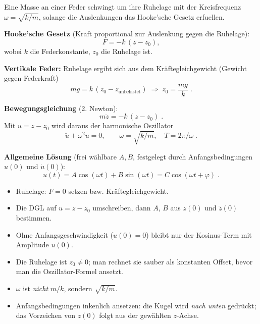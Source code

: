 

Eine Masse an einer Feder schwingt um ihre Ruhelage mit der
Kreisfrequenz $\omega=\sqrt{k/m}$, solange die Auslenkungen das
Hooke'sche Gesetz erfuellen.

\begin{werkzeugkasten}[Werkzeuge]
\textbf{Hooke'sche Gesetz} (Kraft proportional zur Auslenkung gegen die
Ruhelage):
\begin{equation}
  F=-k\,(z-z_0),
\end{equation}
wobei $k$ die Federkonstante, $z_0$ die Ruhelage ist.

\textbf{Vertikale Feder:} Ruhelage ergibt sich aus dem Kräftegleichgewicht
(Gewicht gegen Federkraft)
\begin{equation}
  m g=k\,(z_0-z_{\text{unbelastet}})\;\Rightarrow\;
  z_0=\frac{m g}{k}\;.
\end{equation}

\textbf{Bewegungsgleichung} (2. Newton):
\begin{equation}
  m\ddot z=-k\,(z-z_0)\;.
\end{equation}
Mit $u=z-z_0$ wird daraus der harmonische Oszillator
\begin{equation}
  \ddot u+\omega^2 u=0,\qquad \omega=\sqrt{k/m},\quad
  T=2\pi/\omega\;.
\end{equation}

\textbf{Allgemeine Lösung} (frei wählbare $A,B$, festgelegt durch
Anfangsbedingungen $u(0)$ und $\dot u(0)$):
\begin{equation}
  u(t)=A\cos(\omega t)+B\sin(\omega t)=C\cos(\omega t+\varphi)\;.
\end{equation}
\end{werkzeugkasten}

\begin{werkzeugkasten}[Vorgehen]
\begin{itemize}
  \item Ruhelage: $F=0$ setzen bzw. Kräftegleichgewicht.
  \item Die DGL auf $u=z-z_0$ umschreiben, dann $A$, $B$ aus $z(0)$ und
        $\dot z(0)$ bestimmen.
  \item Ohne Anfangsgeschwindigkeit ($\dot u(0)=0$) bleibt nur der
        Kosinus-Term mit Amplitude $u(0)$.
\end{itemize}
\end{werkzeugkasten}

\begin{achtung}
\begin{itemize}
  \item Die Ruhelage ist $z_0\ne0$; man rechnet sie sauber als konstanten
        Offset, bevor man die Oszillator-Formel ansetzt.
  \item $\omega$ ist \emph{nicht} $m/k$, sondern $\sqrt{k/m}$.
  \item Anfangsbedingungen inkenlich ansetzen: die Kugel wird \emph{nach
        unten} gedrückt; das Vorzeichen von $z(0)$ folgt aus der
        gewählten $z$-Achse.
\end{itemize}
\end{achtung}
